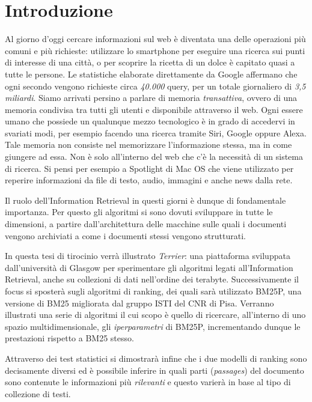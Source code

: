 \chapter{Introduzione}
Al giorno d'oggi cercare informazioni sul web è diventata una delle operazioni più comuni e più richieste:
utilizzare lo smartphone per eseguire una ricerca sui punti di interesse di una città, o per scoprire la ricetta di un dolce è capitato quasi a tutte le persone.
Le statistiche elaborate direttamente da Google affermano che ogni secondo vengono richieste circa \textit{40.000} query, per un totale
giornaliero di \textit{3,5 miliardi}.
Siamo arrivati persino a parlare di memoria \textit{transattiva}, ovvero di una memoria condivisa tra tutti gli utenti e disponibile attraverso il web.
Ogni essere umano che possiede un qualunque mezzo tecnologico è in grado di accedervi in svariati modi, per esempio facendo una ricerca tramite Siri, Google oppure Alexa.
Tale memoria non consiste nel memorizzare l'informazione stessa, ma in come giungere ad essa.
Non è solo all'interno del web che c'è la necessità di un sistema di ricerca. Si pensi per esempio a Spotlight di Mac OS che
viene utilizzato per reperire informazioni da file di testo, audio, immagini e anche news dalla rete.

Il ruolo dell'Information Retrieval in questi giorni è dunque di fondamentale importanza.
Per questo gli algoritmi si sono dovuti sviluppare in tutte le dimensioni, a partire dall'architettura delle macchine sulle quali i documenti vengono archiviati a come i documenti stessi vengono strutturati.

In questa tesi di tirocinio verrà illustrato \textit{Terrier}: una piattaforma sviluppata dall'università di Glasgow
per sperimentare gli algoritmi legati all'Information Retrieval, anche su collezioni di dati nell'ordine dei terabyte.  Successivamente il focus si sposterà
sugli algoritmi di ranking, dei quali sarà utilizzato BM25P, una versione di BM25 migliorata dal gruppo ISTI del CNR di Pisa.
Verranno illustrati una serie di algoritmi il cui scopo è quello di ricercare, all'interno di uno spazio multidimensionale,
gli \textit{iperparametri} di BM25P, incrementando dunque le prestazioni rispetto a BM25 stesso.

Attraverso dei test statistici si dimostrarà infine che i due modelli di ranking sono decisamente diversi ed è possibile
inferire in quali parti (\textit{passages}) del documento sono contenute le informazioni più \textit{rilevanti}
e questo varierà in base al tipo di collezione di testi.

